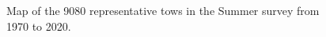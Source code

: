 \documentclass[12pt]{article}\usepackage[]{graphicx}\usepackage[]{color}
\begin{document}
\begin{figure}[htb]

{\centering {} 

}

\caption{Map of the 9080 representative tows in the Summer survey from 1970 to 2020.}\label{fig:map3}
\end{figure}
\end{document}
